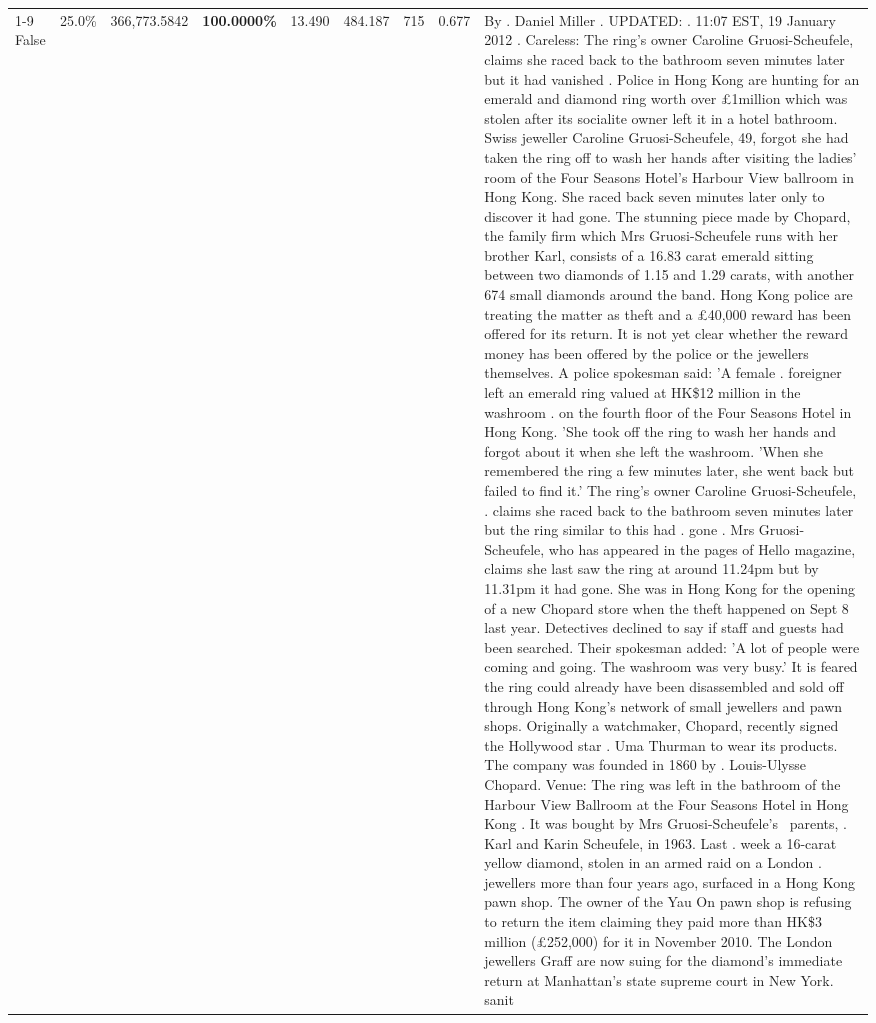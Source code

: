 \begin{table}[H]
\begin{tabular}{lllrlllll}
\cline{1-9}
False & 25.0\% & 366,773.5842 & \bfseries \color{red} 100.0000\% & 13.490 & 484.187 & 715 & 0.677 & By . Daniel Miller . UPDATED: . 11:07 EST, 19 January 2012 . Careless: The ring's owner Caroline Gruosi-Scheufele, claims she raced back to the bathroom seven minutes later but it had vanished . Police in Hong Kong are hunting for an emerald and diamond ring worth over £1million which was stolen after its socialite owner left it in a hotel bathroom. Swiss jeweller Caroline Gruosi-Scheufele, 49, forgot she had taken the ring off to wash her hands after visiting the ladies' room of the Four Seasons Hotel's Harbour View ballroom in Hong Kong. She raced back seven minutes later only to discover it had gone. The stunning piece made by Chopard, the family firm which Mrs Gruosi-Scheufele runs with her brother Karl, consists of a 16.83 carat emerald sitting between two diamonds of 1.15 and 1.29 carats, with another 674 small diamonds around the band. Hong Kong police are treating the matter as theft and a £40,000 reward has been offered for its return. It is not yet clear whether the reward money has been offered by the police or the jewellers themselves. A police spokesman said: 'A female . foreigner left an emerald ring valued at HK\$12 million in the washroom . on the fourth floor of the Four Seasons Hotel in Hong Kong. 'She took off the ring to wash her hands and forgot about it when she left the washroom. 'When she remembered the ring a few minutes later, she went back but failed to find it.' The ring's owner Caroline Gruosi-Scheufele, . claims she raced back to the bathroom seven minutes later but the ring similar to this had . gone . Mrs Gruosi-Scheufele, who has appeared in the pages of Hello magazine, claims she last saw the ring at around 11.24pm but by 11.31pm it had gone. She was in Hong Kong for the opening of a new Chopard store when the theft happened on Sept 8 last year. Detectives declined to say if staff and guests had been searched. Their spokesman added: 'A lot of people were coming and going. The washroom was very busy.' It is feared the ring could already have been disassembled and sold off through Hong Kong's network of small jewellers and pawn shops. Originally a watchmaker, Chopard, recently signed the Hollywood star . Uma Thurman to wear its products. The company was founded in 1860 by . Louis-Ulysse Chopard. Venue: The ring was left in the bathroom of the Harbour View Ballroom at the Four Seasons Hotel in Hong Kong . It was bought by Mrs Gruosi-Scheufele's  parents, . Karl and Karin Scheufele, in 1963. Last . week a 16-carat yellow diamond, stolen in an armed raid on a London . jewellers more than four years ago, surfaced in a Hong Kong pawn shop. The owner of the Yau On pawn shop is refusing to return the item claiming they paid more than HK\$3 million (£252,000) for it in November 2010. The London jewellers Graff are now suing for the diamond’s immediate return at Manhattan’s state supreme court in New York. sanit \\

\end{tabular}
\end{table}
